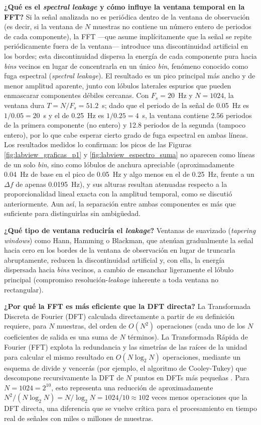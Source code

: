 \documentclass[conference]{IEEEtran}
\begin{document}
\textbf{¿Qué es el \textit{spectral leakage} y cómo influye la ventana temporal en la FFT?} Si la señal analizada no es periódica dentro de la ventana de observación (es decir, si la ventana de $N$ muestras no contiene un número entero de periodos de cada componente), la FFT —que asume implícitamente que la señal se repite periódicamente fuera de la ventana— introduce una discontinuidad artificial en los bordes; esta discontinuidad dispersa la energía de cada componente pura hacia \textit{bins} vecinos en lugar de concentrarla en un único \textit{bin}, fenómeno conocido como fuga espectral (\textit{spectral leakage}). El resultado es un pico principal más ancho y de menor amplitud aparente, junto con lóbulos laterales espurios que pueden enmascarar componentes débiles cercanas. Con $F_s=20$~Hz y $N=1024$, la ventana dura $T=N/F_s=51.2$~s; dado que el periodo de la señal de 0.05~Hz es $1/0.05=20$~s y el de 0.25~Hz es $1/0.25=4$~s, la ventana contiene 2.56 periodos de la primera componente (no entero) y 12.8 periodos de la segunda (tampoco entero), por lo que cabe esperar cierto grado de fuga espectral en ambas líneas. Los resultados medidos lo confirman: los picos de las Figuras \ref{fig:labview_graficas_p1} y \ref{fig:labview_espectro_suma} no aparecen como líneas de un solo \textit{bin}, sino como lóbulos de anchura apreciable (aproximadamente 0.04~Hz de base en el pico de 0.05~Hz y algo menos en el de 0.25~Hz, frente a un $\Delta f$ de apenas 0.0195~Hz), y sus alturas resultan atenuadas respecto a la proporcionalidad lineal exacta con la amplitud temporal, como se discutió anteriormente. Aun así, la separación entre ambas componentes es más que suficiente para distinguirlas sin ambigüedad.

\textbf{¿Qué tipo de ventana reduciría el \textit{leakage}?} Ventanas de suavizado (\textit{tapering windows}) como Hann, Hamming o Blackman, que atenúan gradualmente la señal hacia cero en los bordes de la ventana de observación en lugar de truncarla abruptamente, reducen la discontinuidad artificial y, con ella, la energía dispersada hacia \textit{bins} vecinos, a cambio de ensanchar ligeramente el lóbulo principal (compromiso resolución-\textit{leakage} inherente a toda ventana no rectangular).

\textbf{¿Por qué la FFT es más eficiente que la DFT directa?} La Transformada Discreta de Fourier (DFT) calculada directamente a partir de su definición requiere, para $N$ muestras, del orden de $O(N^2)$ operaciones (cada uno de los $N$ coeficientes de salida es una suma de $N$ términos). La Transformada Rápida de Fourier (FFT) explota la redundancia y las simetrías de las raíces de la unidad para calcular el mismo resultado en $O(N\log_2 N)$ operaciones, mediante un esquema de divide y vencerás (por ejemplo, el algoritmo de Cooley-Tukey) que descompone recursivamente la DFT de $N$ puntos en DFTs más pequeñas \cite{proakis}. Para $N=1024=2^{10}$, esto representa una reducción de aproximadamente $N^2/(N\log_2 N)=N/\log_2 N=1024/10\approx102$ veces menos operaciones que la DFT directa, una diferencia que se vuelve crítica para el procesamiento en tiempo real de señales con miles o millones de muestras.
\end{document}
